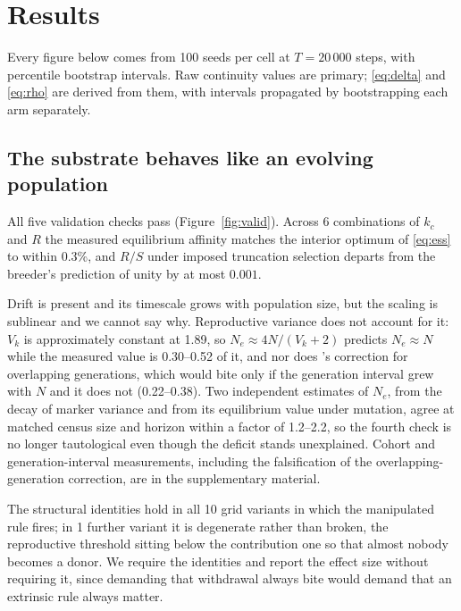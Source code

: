 \section{Results}

Every figure below comes from 100 seeds per cell at $T=20\,000$ steps, with percentile bootstrap intervals. Raw continuity values are
primary; \eqref{eq:delta} and \eqref{eq:rho} are derived from them, with
intervals propagated by bootstrapping each arm separately.

\subsection{The substrate behaves like an evolving population}

All five validation checks pass (Figure~\ref{fig:valid}). Across 6 combinations of $k_c$ and $R$ the measured
equilibrium affinity matches the interior optimum of \eqref{eq:ess} to
within 0.3\%, and $R/S$ under imposed truncation
selection departs from the breeder's prediction of unity by at most
$0.001$.

Drift is present and its timescale grows with population size,
but the scaling is sublinear and we cannot say why. Reproductive
variance does not account for it: $V_k$ is approximately
constant at 1.89, so $N_e\approx4N/(V_k+2)$
predicts $N_e\approx N$ while the measured value is 0.30--0.52 of it, and
nor does \citet{hill1972}'s correction for overlapping
generations, which would bite only if the generation interval
grew with $N$ and it does not (0.22--0.38). Two independent estimates of $N_e$, from
the decay of marker variance and from its equilibrium value
under mutation, agree at matched census size and horizon within
a factor of 1.2--2.2, so
the fourth check is no longer tautological even though the
deficit stands unexplained. Cohort and generation-interval
measurements, including the falsification of the
overlapping-generation correction, are in the supplementary
material.

The structural identities hold in all 10 grid variants in which the manipulated rule fires; in 1 further variant it is degenerate rather than
broken, the reproductive threshold sitting below the contribution one so
that almost nobody becomes a donor. We require the identities and report
the effect size without requiring it, since demanding that withdrawal
always bite would demand that an extrinsic rule always matter.

